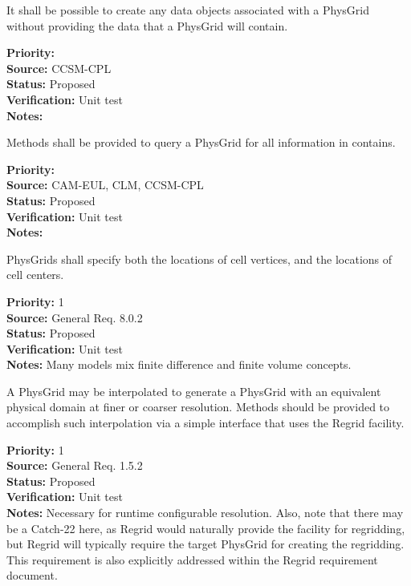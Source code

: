 It shall be possible to create any data objects associated with a PhysGrid without
providing the data that a PhysGrid will contain.
\begin{reqlist}
{\bf Priority:} \\
{\bf Source:} CCSM-CPL \\
{\bf Status:} Proposed \\
{\bf Verification:} Unit test\\
{\bf Notes:} 
\end{reqlist}

Methods shall be provided to query a PhysGrid for all information in contains.
\begin{reqlist}
{\bf Priority:} \\
{\bf Source:} CAM-EUL, CLM, CCSM-CPL \\
{\bf Status:} Proposed \\
{\bf Verification:} Unit test\\
{\bf Notes:} 
\end{reqlist}

PhysGrids shall specify both the locations of cell vertices, and the locations
of cell centers.
\begin{reqlist}
{\bf Priority:} 1 \\
{\bf Source:} General Req. 8.0.2 \\
{\bf Status:} Proposed \\
{\bf Verification:} Unit test\\
{\bf Notes:} Many models mix finite difference and finite volume concepts.
\end{reqlist}

A PhysGrid may be interpolated to generate a PhysGrid with an equivalent physical
domain at finer or coarser resolution.  Methods should be provided to accomplish such
interpolation via a simple interface that uses the Regrid facility.
\begin{reqlist}
{\bf Priority:} 1 \\
{\bf Source:} General Req. 1.5.2 \\
{\bf Status:} Proposed \\
{\bf Verification:} Unit test\\
{\bf Notes:} Necessary for runtime configurable resolution.  Also, note that 
there may be a Catch-22 here, as Regrid would naturally provide the facility
for regridding, but Regrid will typically require the target PhysGrid for
creating the regridding.  This requirement is also explicitly addressed within the
Regrid requirement document.
\end{reqlist}

